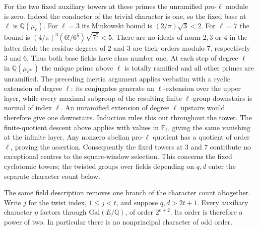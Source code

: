 \documentclass[11pt]{amsart}
\theoremstyle{definition}
\theoremstyle{remark}
\begin{document}
For the two fixed auxiliary towers at these primes the unramified
pro-$\ell$ module is zero. Indeed the conductor of the trivial
character is one, so the fixed base at $\ell$ is
$\mathbb Q(\mu_\ell)$. For $\ell=3$ its Minkowski bound is
$(2/\pi)\sqrt3<2$. For $\ell=7$ the bound is
$(4/\pi)^3(6!/6^6)\sqrt{7^5}<5$. There are no ideals of norm
$2,3$ or $4$ in the latter field: the residue degrees of $2$ and $3$
are their orders modulo $7$, respectively $3$ and $6$. Thus both
base fields have class number one. At each step of degree $\ell$
in $\mathbb Q(\mu_{\ell^\infty})$ the unique prime above $\ell$
is totally ramified and all other primes are unramified. The preceding
inertia argument applies verbatim with a cyclic extension of degree
$\ell$: its conjugates generate an $\ell$-extension over the upper
layer, while every maximal subgroup of the resulting finite
$\ell$-group downstairs is normal of index $\ell$. An unramified
extension of degree $\ell$ upstairs would therefore give one downstairs.
Induction rules this out throughout the tower. The finite-quotient
descent above applies with values in $\mathbb F_\ell$, giving the
same vanishing at the infinite layer. Any nonzero abelian pro-$\ell$
quotient has a quotient of order $\ell$, proving the assertion.
Consequently the fixed towers at $3$ and $7$ contribute no exceptional
centres to the square-window selection. This concerns the fixed
cyclotomic towers; the twisted groups over fields depending on $q,d$
enter the separate character count below.

The same field description removes one branch of the character
count altogether. Write $j$ for the twist index, $1\le j<t$, and
suppose $q,d>2t+1$. Every auxiliary character $\eta$ factors through
$\mathrm{Gal}(E/\mathbb Q)$, of order $2^{e+2}$. Its order is
therefore a power of two. In particular there is no nonprincipal
character of odd order.
\end{document}
